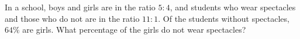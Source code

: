 In a school, boys and girls are in the ratio $5:4$, and students who wear spectacles and those who do not are in the ratio $11:1$. Of the students without spectacles, $64\%$ are girls. What percentage of the girls do not wear spectacles?

